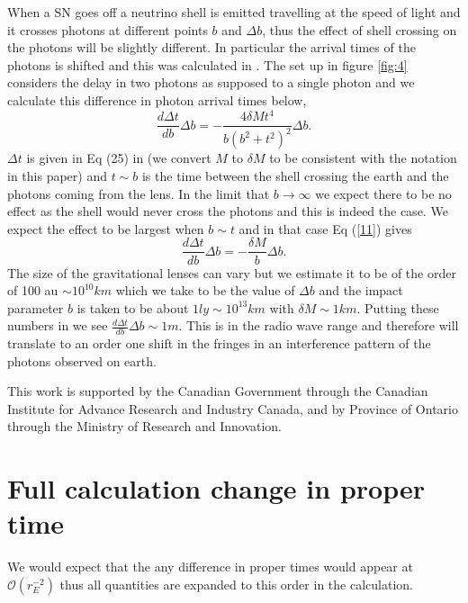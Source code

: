 \documentclass[aps,showpacs,twocolumn,floats,prd,superscriptaddress,nofootinbib]{revtex4-1}
\begin{document}
When a SN goes off a neutrino shell is emitted travelling at the speed of light and it crosses photons at different points $b$ and $\Delta b$, thus the effect of shell crossing on the photons will be slightly different. In particular the arrival times of the photons is shifted and this was calculated in \cite{Olum:2013gza}. The set up in figure \ref{fig:4} considers the delay in two photons as supposed to a single photon and we calculate this difference in photon arrival times below,
\begin{equation}
	\frac{d \Delta t}{d b} \Delta b = - \frac{4\delta Mt^4}{b(b^2 + t^2)^2} \Delta b.	\label{11}
\end{equation}
$\Delta t$ is given in Eq (25) in \cite{Olum:2013gza} (we convert $M$ to $\delta M$ to be consistent with the notation in this paper) and $t \sim b$ is the time between the shell crossing the earth and the photons coming from the lens. In the limit that $b\rightarrow \infty$ we expect there to be no effect as the shell would never cross the photons and this is indeed the case. We expect the effect to be largest when $b \sim t$ and in that case Eq (\ref{11}) gives
\begin{equation}
	\frac{d \Delta t}{db } \Delta b = - \frac{\delta M}{b} \Delta b.
\end{equation}
The size of the gravitational lenses can vary but we estimate it to be of the order of 100 au $\sim 10^{10} km$ which we take to be the value of $\Delta b$ and the impact parameter $b$ is taken to be about $1 ly \sim 10^{13} km$ with $\delta M \sim 1 km$. Putting these numbers in we see $\frac{d \Delta t}{db} \Delta b \sim 1 m$. This is in the radio wave range and therefore will translate to an order one shift in the fringes in an interference pattern of the photons observed on earth.

\acknowledgments

This work is supported by the Canadian Government through the Canadian Institute for Advance Research and Industry Canada, and by Province of Ontario through the Ministry of Research and Innovation.

\appendix

\section{Full calculation change in proper time}

We would expect that the any difference in proper times would appear at $\mathcal{O}(r_E^{-2})$ thus all quantities are expanded to this order in the calculation. 
\end{document}

